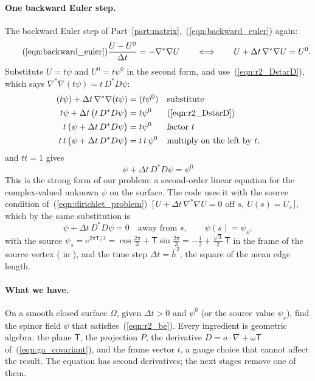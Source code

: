 \paragraph{One backward Euler step.} The backward Euler step of Part~\ref{part:matrix},~(\ref{eqn:backward_euler}) again:
\begin{equation*}
\tag{\ref{eqn:backward_euler}}
\frac{U - U^0}{\Delta t} = -\nabla^* \nabla U \qquad \Longleftrightarrow \qquad U + \Delta t\, \nabla^* \nabla U = U^0 .
\end{equation*}
Substitute $U = t\psi$ and $U^0 = t\psi^0$ in the second form, and use~(\ref{eqn:r2_DstarD}), which says $\nabla^*\nabla(t\psi) = t\,D^*D\psi$:
\begin{align*}
(t\psi) + \Delta t\, \nabla^*\nabla(t\psi) &= (t\psi^0) && \text{substitute} \\
t\psi + \Delta t\, \big(t\, D^*D\psi\big) &= t\psi^0 && (\ref{eqn:r2_DstarD}) \\
t\,\big(\psi + \Delta t\, D^*D\psi\big) &= t\psi^0 && \text{factor } t \\
t\,t\,\big(\psi + \Delta t\, D^*D\psi\big) &= t\,t\,\psi^0 && \text{multiply on the left by } t ,
\end{align*}
and $tt = 1$ gives
\begin{equation}
\label{eqn:r2_be}
\boxed{\;\psi + \Delta t\, D^*D\psi = \psi^0 \;}
\end{equation}
This is the strong form of our problem: a second-order linear equation for the complex-valued unknown $\psi$ on the surface. The code uses it with the source condition of~(\ref{eqn:dirichlet_problem})~[\,$U + \Delta t\,\nabla^*\nabla U = 0 \text{ off } s,\ U(s) = U_s$\,], which by the same substitution is
\begin{equation}
\label{eqn:r2_source}
\psi + \Delta t\, D^*D\psi = 0 \quad\text{away from } s, \qquad \psi(s) = \psi_s ,
\end{equation}
with the source $\psi_s = e^{2\pi\mathsf T/3} = \cos\frac{2\pi}3 + \mathsf T\sin\frac{2\pi}3 = -\frac12 + \frac{\sqrt3}2\,\mathsf T$ in the frame of the source vertex ( in ), and the time step $\Delta t = \bar h^2$, the square of the mean edge length.

\paragraph{What we have.} On a smooth closed surface $\Omega$, given $\Delta t > 0$ and $\psi^0$ (or the source value $\psi_s$), find the spinor field $\psi$ that satisfies~(\ref{eqn:r2_be}). Every ingredient is geometric algebra: the plane $\mathsf T$, the projection $P$, the derivative $D = a\cdot\nabla + \omega\mathsf T$ of~(\ref{eqn:ga_covariant}), and the frame vector $t$, a gauge choice that cannot affect the result. The equation has second derivatives; the next stages remove one of them.

